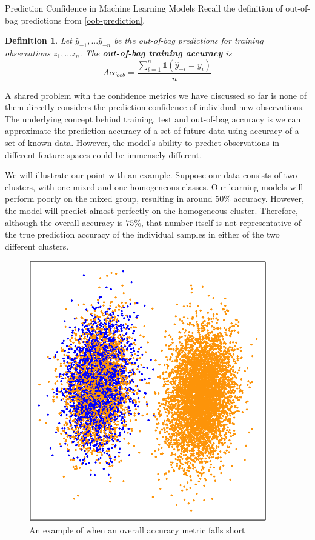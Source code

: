 \documentclass[12pt]{pom_thesis}
\newtheorem{definition}{Definition}[section]
\begin{document}
\begin{chapter}{Prediction Confidence in Machine Learning Models}
Recall the definition of out-of-bag predictions from \ref{oob-prediction}. 

\begin{definition}
Let $\hat{y}_{-1},...\hat{y}_{-n}$ be the out-of-bag predictions for training observations $z_1,...z_n$. The \textbf{out-of-bag training accuracy} is 
\begin{equation}
\label{acc_oob}
   Acc_{oob}=\frac{\sum_{i=1}^n \mathbb{1}(\hat{y}_{-i}=y_i)}{n}
\end{equation}
\end{definition}

A shared problem with the confidence metrics we have discussed so far is none of them directly considers the prediction confidence of individual new observations. The underlying concept behind training, test and out-of-bag accuracy is we can approximate the prediction accuracy of a set of future data using accuracy of a set of known data. However, the model's ability to predict observations in different feature spaces could be immensely different.

We will illustrate our point with an example. Suppose our data consists of two clusters, with one mixed and one homogeneous classes. Our learning models will perform poorly on the mixed group, resulting in around $50\%$ accuracy. However, the model will predict almost perfectly on the homogeneous cluster. Therefore, although the overall accuracy is $75\%$, that number itself is not representative of the true prediction accuracy of the individual samples in either of the two different clusters. 

\begin{figure}[h]
    \centering
    \includegraphics[scale=0.26]{cluster1.png}
    \caption{An example of when an overall accuracy metric falls short}
    \label{local_confidence_demo}
\end{figure}


\end{chapter}
\end{document}
